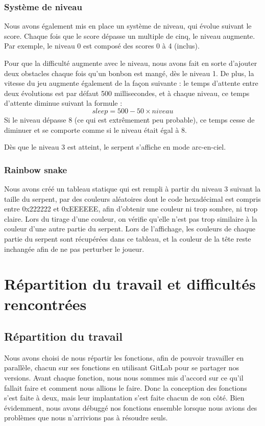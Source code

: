 \documentclass[a4paper]{article}
\begin{document}
\subsubsection*{Système de niveau}
Nous avons également mis en place un système de niveau, qui évolue suivant le score. Chaque fois que le score dépasse un multiple de cinq, le niveau augmente. Par exemple, 
le niveau 0 est composé des scores 0 à 4 (inclus).

Pour que la difficulté augmente avec le niveau, nous avons fait en sorte d'ajouter deux obstacles chaque fois qu'un bonbon est mangé, dès le niveau 1. De plus, la vitesse 
du jeu augmente également de la façon suivante : le temps d'attente entre deux évolutions est par défaut 500 millisecondes, et à chaque niveau, ce temps d'attente diminue 
suivant la formule :
\[sleep = 500-50\times niveau\]
Si le niveau dépasse 8 (ce qui est extrêmement peu probable), ce temps cesse de diminuer et se comporte comme si le niveau était égal à 8.

Dès que le niveau 3 est atteint, le serpent s'affiche en mode arc-en-ciel.

\subsubsection*{Rainbow snake}
Nous avons créé un tableau statique qui est rempli à partir du niveau 3 suivant la taille du serpent, par des couleurs aléatoires dont le code hexadécimal est compris entre 
0x222222 et 0xEEEEEE, afin d'obtenir une couleur ni trop sombre, ni trop claire. Lors du tirage d'une couleur, on vérifie qu'elle n'est pas trop similaire à la couleur d'une 
autre partie du serpent.
Lors de l'affichage, les couleurs de chaque partie du serpent sont récupérées dans ce tableau, et la couleur de la tête reste inchangée afin de ne pas perturber le joueur.

\section{Répartition du travail et difficultés rencontrées}

\subsection{Répartition du travail}
Nous avons choisi de nous répartir les fonctions, afin de pouvoir travailler en parallèle, chacun sur ses fonctions en utilisant GitLab pour se partager nos versions.
Avant chaque fonction, nous nous sommes mis d'accord sur ce qu'il fallait faire et comment nous allions le faire. Donc la conception des fonctions s'est faite à deux, mais
leur implantation s'est faite chacun de son côté. Bien évidemment, nous avons débuggé nos fonctions ensemble lorsque nous avions des problèmes que nous n'arrivions pas 
à résoudre seuls.
\end{document}
